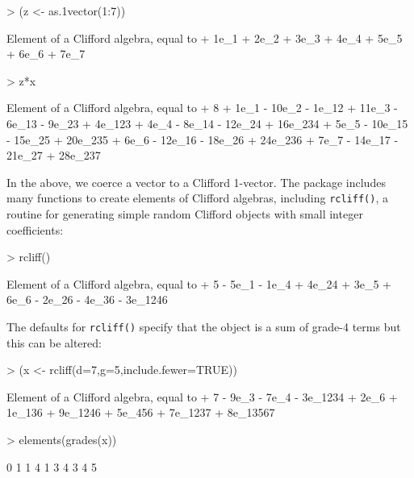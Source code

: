 \documentclass{birkjour}
\theoremstyle{definition}
\theoremstyle{remark}
\numberwithin{equation}{section}
\begin{document}
\begin{Schunk}
\begin{Sinput}
> (z <- as.1vector(1:7))
\end{Sinput}
\begin{Soutput}
Element of a Clifford algebra, equal to
+ 1e_1 + 2e_2 + 3e_3 + 4e_4 + 5e_5 + 6e_6 + 7e_7
\end{Soutput}
\begin{Sinput}
> z*x
\end{Sinput}
\begin{Soutput}
Element of a Clifford algebra, equal to
+ 8 + 1e_1 - 10e_2 - 1e_12 + 11e_3 - 6e_13 - 9e_23 + 4e_123 +
4e_4 - 8e_14 - 12e_24 + 16e_234 + 5e_5 - 10e_15 - 15e_25 + 20e_235 +
6e_6 - 12e_16 - 18e_26 + 24e_236 + 7e_7 - 14e_17 - 21e_27 + 28e_237
\end{Soutput}
\end{Schunk}

In the above, we coerce a vector to a Clifford 1-vector.  The package
includes many functions to create elements of Clifford algebras,
including {\tt rcliff()}, a routine for generating
simple random Clifford objects with small integer
  coefficients:

\begin{Schunk}
\begin{Sinput}
> rcliff()
\end{Sinput}
\begin{Soutput}
Element of a Clifford algebra, equal to
+ 5 - 5e_1 - 1e_4 + 4e_24 + 3e_5 + 6e_6 - 2e_26 - 4e_36 - 3e_1246
\end{Soutput}
\end{Schunk}

The defaults for {\tt rcliff()} specify that the object is a sum of
grade-4 terms but this can be altered:

\begin{Schunk}
\begin{Sinput}
> (x <- rcliff(d=7,g=5,include.fewer=TRUE))
\end{Sinput}
\begin{Soutput}
Element of a Clifford algebra, equal to
+ 7 - 9e_3 - 7e_4 - 3e_1234 + 2e_6 + 1e_136 + 9e_1246 + 5e_456
+ 7e_1237 + 8e_13567
\end{Soutput}
\begin{Sinput}
> elements(grades(x))
\end{Sinput}
\begin{Soutput}
 [1] 0 1 1 4 1 3 4 3 4 5
\end{Soutput}
\end{Schunk}
\end{document}
